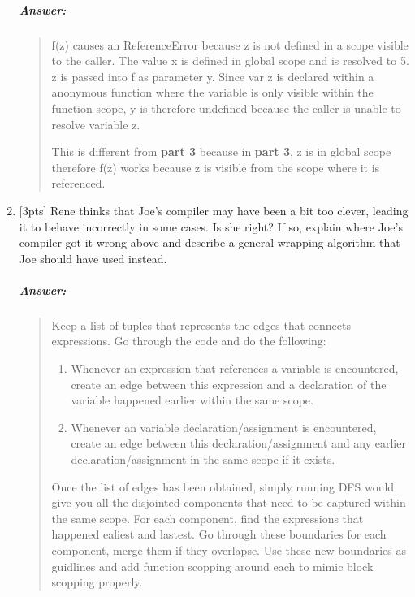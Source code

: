 \documentclass{article}
\begin{document}
\begin{enumerate}[label=\textbf{\arabic*}.]
		\subparagraph{Answer: }
			\begin{quote}
			f(z) causes an ReferenceError because z is not defined in a scope visible
			to the caller. The value x is defined in global scope and is resolved to 5. 
			z is passed into f as parameter y. Since var z is declared within a anonymous 
			function where the variable is only visible within the function scope, 
			y is therefore undefined because the caller is unable to resolve variable
			z.
			\par This is different from \textbf{part 3} because in \textbf{part 3}, 
			z is in global scope therefore f(z) works because z is visible from the scope 
			where it is referenced.
			\end{quote}

	\item {[3pts]} Rene thinks that Joe’s compiler may have been a bit too
		clever, leading it to behave incorrectly
		in some cases. Is she right? If so, explain where Joe’s compiler got it wrong
		above and describe a
		general wrapping algorithm that Joe should have used instead.

		\subparagraph{Answer: }
			\begin{quote}
			Keep a list of tuples that represents the edges that connects expressions.
			Go through the code and do the following:
			\begin{enumerate}[label=\textbf{\arabic*}.]
				\item Whenever an expression that references a variable is encountered,
					create an edge between this expression and a declaration of the
					variable happened earlier within the same scope.
				\item Whenever an variable declaration/assignment is encountered,
					create an edge between this declaration/assignment and any earlier
					declaration/assignment in the same scope if it exists.
			\end{enumerate}
			Once the list of edges has been obtained, simply running DFS would give
			you all the disjointed components that need to be captured within the same
			scope. For each component, find the expressions that happened ealiest and
			lastest. Go through these boundaries for each component, merge them if
			they overlapse. Use these new boundaries as guidlines and add function
			scopping around each to mimic block scopping properly.
			\end{quote}

\end{enumerate}
\end{document}
